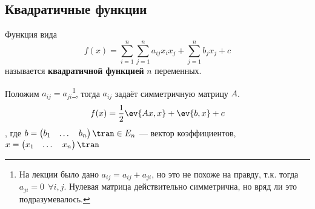 \subsection{Квадратичные функции}

\begin{definition}
    Функция вида
    \begin{equation}
        f(x) = \sum_{i = 1}^n \sum_{j = 1}^n a_{ij} x_i x_j + \sum_{j = 1}^n b_j x_j + c \label{квадратичная функция}
    \end{equation}
    называется \textbf{квадратичной функцией} \(n\) переменных.
\end{definition}

Положим \(a_{ij} = a_{ji}\)\footnote{На лекции было дано \(a_{ij} = a_{ij} + a_{ji}\), но это не похоже на правду, т.к. тогда \(a_{ji} = 0 \ \ \forall i, j\). Нулевая матрица действительно симметрична, но вряд ли это подразумевалось.}, тогда \(a_{ij}\) задаёт симметричную матрицу \(A\).
\begin{equation}
    f(x) = \frac{1}{2} \ev{Ax, x} + \ev{b, x} + c \label{квадратичная функция с симметричной матрицей}
\end{equation}
, где \(b = \begin{pmatrix} b_1 & \dots & b_n \end{pmatrix}\tran \in E_n\) --- вектор коэффициентов, \(x = \begin{pmatrix} x_1 & \dots & x_n \end{pmatrix}\tran \)

